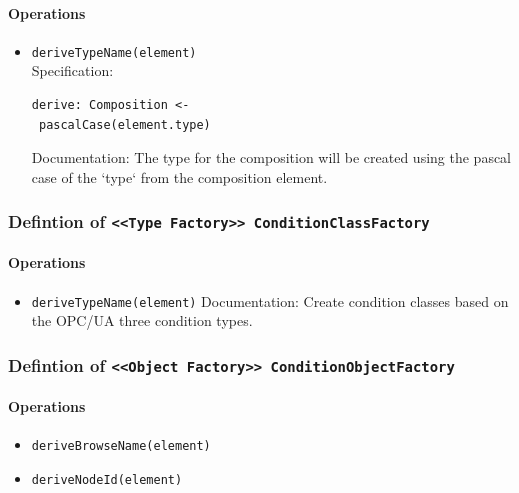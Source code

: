 \FloatBarrier



\paragraph{Operations}
\begin{itemize}
  \item \texttt{deriveTypeName(element)}\\
    Specification:
   \indent \begin{lstlisting}
derive: Composition <-
 pascalCase(element.type)
\end{lstlisting}

    Documentation: The type for the composition will be created using the pascal case of the `type` from the composition element.

\end{itemize}
\FloatBarrier
\subsubsection{Defintion of \texttt{<<Type Factory>> ConditionClassFactory}} \label{type:ConditionClassFactory}

\FloatBarrier



\paragraph{Operations}
\begin{itemize}
  \item \texttt{deriveTypeName(element)}
    Documentation: Create condition classes based on the OPC/UA three condition  types.

\end{itemize}
\FloatBarrier
\subsubsection{Defintion of \texttt{<<Object Factory>> ConditionObjectFactory}} \label{type:ConditionObjectFactory}

\FloatBarrier



\paragraph{Operations}
\begin{itemize}
  \item \texttt{deriveBrowseName(element)}
  \item \texttt{deriveNodeId(element)}
\end{itemize}
